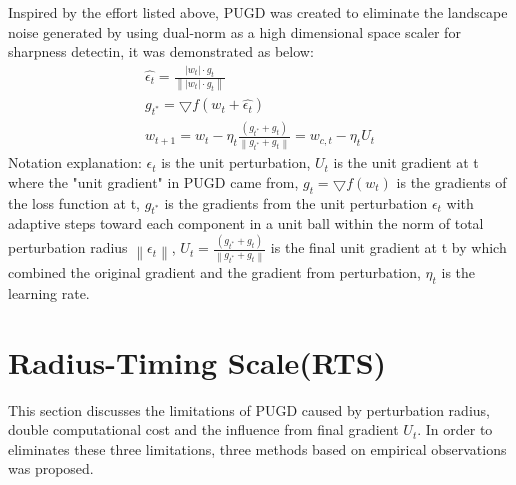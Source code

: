 \documentclass[10pt,twocolumn,letterpaper]{article}
\begin{document}
Inspired by the effort listed above, PUGD \cite{Tseng_2022} was created to eliminate the landscape noise generated by using dual-norm as a high dimensional space scaler for sharpness detectin, it was demonstrated as below:
\begin{gather}
	\hat{\epsilon_{t}} = \frac{\left | w_t \right | \cdot g_t}{\left \| \left | w_t \right | \cdot g_t \right \| } \label{eq:1} \\
	g_{t^{*}} = \bigtriangledown f (w_t + \hat{\epsilon_{t} }) \label{eq:2} \\
	w_{t+1} = w_{t} - \eta _t \frac{(g_{t^{*}} + g_t)}{\left \|g_{t^{*}} + g_t\right \| } = w_{c,t} - \eta _t U_t \label{eq:3} 
\end{gather}
Notation explanation: $\epsilon_{t}$ is the unit perturbation, $U_t$ is the unit gradient at t where the "unit gradient" in PUGD came from,  $g_t = \bigtriangledown f (w_t)$ is the gradients of the loss function at t, $g_{t^{*}}$ is the gradients from the unit perturbation $\epsilon_{t}$ with adaptive steps toward each component in a unit ball within the norm of total perturbation radius $\left \| \epsilon_{t} \right \|$, $U_t = \frac{(g_{t^{*}} + g_t)}{\left \|g_{t^{*}} + g_t\right \| }$ is the final unit gradient at t by which combined the original gradient and the gradient from perturbation, $\eta_t$ is the learning rate.

\section{Radius-Timing Scale(RTS)}
\label{sec:3}
This section discusses the limitations of PUGD caused by perturbation radius, double computational cost and the influence from final gradient $U_t$. In order to eliminates these three limitations, three methods based on empirical observations was proposed. 
\end{document}
